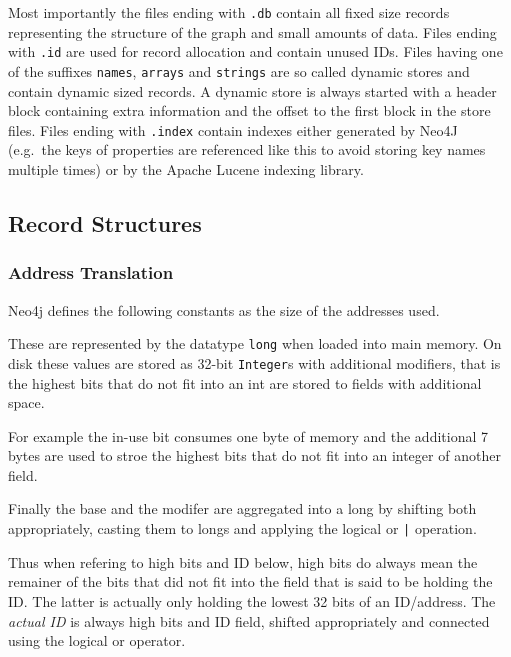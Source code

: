 \documentclass[a4paper,10pt]{article}
\begin{document}
        Most importantly the files ending with \texttt{.db} contain all fixed size records representing the structure of the graph and small amounts of data.
        Files ending with \texttt{.id} are used for record allocation and contain unused IDs. 
        Files having one of the suffixes \texttt{names}, \texttt{arrays} and \texttt{strings} are so called dynamic stores and contain dynamic sized records. 
        A dynamic store is always started with a header block containing extra information and the offset to the first block in the store files. 
        Files ending with \texttt{.index} contain indexes either generated by Neo4J (e.g.\ the keys of properties are referenced like this to avoid storing key names multiple times) or by the Apache Lucene indexing library.
        
    
    \subsection{Record Structures}
        \subsubsection{Address Translation}
            Neo4j defines the following constants as the size of the addresses used.
            \begin{figure}[htp]\label{addrsize}
            \end{figure}
            These are represented by the datatype \texttt{long} when loaded into main memory. 
            On disk these values are stored as 32-bit \texttt{Integer}s with additional modifiers, that is the highest bits that do not fit into an int are stored to fields with additional space.
            
            For example the in-use bit consumes one byte of memory and the additional 7 bytes are used to stroe the highest bits that do not fit into an integer of another field.
            
            Finally the base and the modifer are aggregated into a long by shifting both appropriately, casting them to longs and applying the logical or \texttt{|} operation.
            
            Thus when refering to high bits and ID below, high bits do always mean the remainer of the bits that did not fit into the field that is said to be holding the ID\@.
            The latter is actually only holding the lowest 32 bits of an ID/address. The \textit{actual ID} is always high bits and ID field, shifted appropriately and connected using the logical or operator.
            
\end{document}
